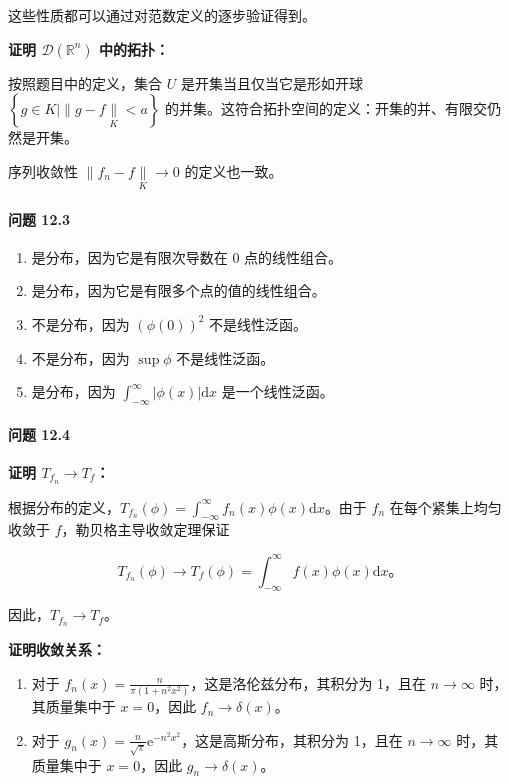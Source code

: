 这些性质都可以通过对范数定义的逐步验证得到。

\textbf{证明 \(\mathcal{D}\left( \mathbb{R}^{n} \right)\) 中的拓扑：}

按照题目中的定义，集合 \(U\) 是开集当且仅当它是形如开球
\(\left\{ g \in K \mid \parallel g - f\underset{K}{\parallel} < a \right\}\)
的并集。这符合拓扑空间的定义：开集的并、有限交仍然是开集。

序列收敛性 \(\parallel f_{n} - f\underset{K}{\parallel} \rightarrow 0\)
的定义也一致。

\paragraph{问题 12.3}\label{ux95eeux9898-12.3}

\begin{enumerate}
\def\labelenumi{(\alph{enumi})}
\item
  是分布，因为它是有限次导数在 0 点的线性组合。
\item
  是分布，因为它是有限多个点的值的线性组合。
\item
  不是分布，因为 \(\left( \phi(0) \right)^{2}\) 不是线性泛函。
\item
  不是分布，因为 \(\sup\phi\) 不是线性泛函。
\item
  是分布，因为
  \(\int_{- \infty}^{\infty}\left| \phi(x) \right|\mathrm{d}x\)
  是一个线性泛函。
\end{enumerate}

\paragraph{问题 12.4}\label{ux95eeux9898-12.4}

\textbf{证明 \(T_{f_{n}} \rightarrow T_{f}\)：}

根据分布的定义，\(T_{f_{n}}(\phi) = \int_{- \infty}^{\infty}f_{n}(x)\phi(x)\mathrm{d}x\)。由于
\(f_{n}\) 在每个紧集上均匀收敛于 \(f\)，勒贝格主导收敛定理保证

\[T_{f_{n}}(\phi) \rightarrow T_{f}(\phi) = \int_{- \infty}^{\infty}f(x)\phi(x)\mathrm{d}x。\]

因此，\(T_{f_{n}} \rightarrow T_{f}\)。

\textbf{证明收敛关系：}

\begin{enumerate}
\def\labelenumi{(\alph{enumi})}
\item
  对于
  \(f_{n}(x) = \frac{n}{\pi\left( 1 + n^{2}x^{2} \right)}\)，这是洛伦兹分布，其积分为
  1，且在 \(n \rightarrow \infty\) 时，其质量集中于 \(x = 0\)，因此
  \(f_{n} \rightarrow \delta(x)\)。
\item
  对于
  \(g_{n}(x) = \frac{n}{\sqrt{\pi}}\mathrm{e}^{- n^{2}x^{2}}\)，这是高斯分布，其积分为
  1，且在 \(n \rightarrow \infty\) 时，其质量集中于 \(x = 0\)，因此
  \(g_{n} \rightarrow \delta(x)\)。
\end{enumerate}

